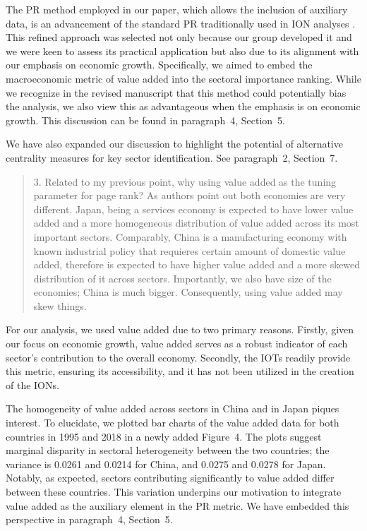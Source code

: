 \documentclass[12pt]{article}
\newenvironment{comment}%
{\begin{quotation}\noindent\small\it\color{darkblue}\ignorespaces%
}{\end{quotation}}
\begin{document}
The PR method employed in our paper, which allows the inclusion of
auxiliary data, is an advancement of the standard PR traditionally used in
ION analyses \citep{cerina2015world}. This refined approach was selected
not only
because our group developed it and we were keen to assess its practical
application but also due to its alignment with our emphasis on economic
growth. Specifically, we aimed to embed the macroeconomic metric of value added
into the sectoral importance ranking. While we recognize in the revised
manuscript that this method could potentially bias the analysis, we also view
this as advantageous when the emphasis is on economic growth. This discussion
can be found in paragraph~4, Section~5.


We have also expanded our discussion to highlight the potential of alternative
centrality measures for key sector identification. See paragraph~2, Section~7.


\begin{comment}
3. Related to my previous point, why using value added as the tuning parameter
for page rank? As authors point out both economies are very different. Japan,
being a services economy is expected to have lower value added and a more
homogeneous distribution of value added across its most important sectors.
Comparably, China is a manufacturing economy with known industrial policy that
requieres certain amount of domestic value added, therefore is expected to have
higher value added and a more skewed distribution of it across sectors.
Importantly, we also have size of the economies; China is much bigger.
Consequently, using value added may skew things.
\end{comment}


For our analysis, we used value added due to two primary
reasons. Firstly, given our focus on economic growth, value added serves as a
robust indicator of each sector's contribution to the overall economy. Secondly,
the IOTs readily provide this metric, ensuring its accessibility, and it has not
been utilized in the creation of the IONs.


The homogeneity of value added across sectors in China and in Japan piques
interest. To elucidate, we plotted bar charts of the value added data
for both countries in 1995 and 2018 in a newly added Figure~4. The plots suggest
marginal disparity in sectoral heterogeneity between the two countries; the
variance is 0.0261 and 0.0214 for China, and 0.0275 and 0.0278 for Japan.
Notably, as expected, sectors
contributing significantly to value added differ between these countries. This
variation underpins our motivation to integrate value added as the auxiliary
element in the PR metric. We have embedded this perspective in
paragraph~4, Section~5.
\end{document}
